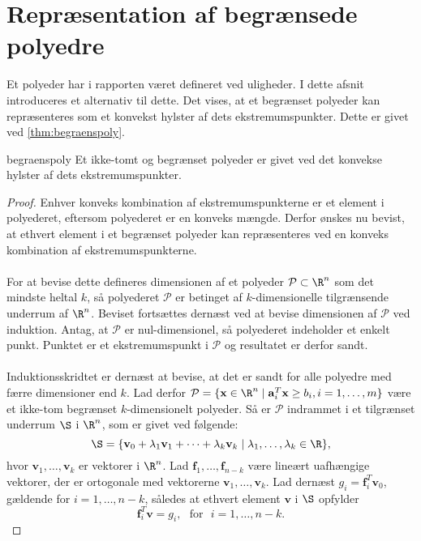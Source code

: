 \newpage
\section{Repræsentation af begrænsede polyedre}
%
Et polyeder har i rapporten været defineret ved uligheder. 
I dette afsnit introduceres et alternativ til dette. 
Det vises, at et begrænset polyeder kan repræsenteres som et konvekst hylster af dets ekstremumspunkter. 
Dette er givet ved \ref{thm:begraenspoly}. 
\begin{thm}{}{begraenspoly}
Et ikke-tomt og begrænset polyeder er givet ved det konvekse hylster af dets ekstremumspunkter.
\end{thm}
%
\begin{proof}
Enhver konveks kombination af ekstremumspunkterne er et element i polyederet, eftersom polyederet er en konveks mængde. 
Derfor ønskes nu bevist, at ethvert element i et begrænset polyeder kan repræsenteres ved en konveks kombination af ekstremumspunkterne. 
\\\\
For at bevise dette defineres dimensionen af et polyeder $\mathcal{P} \subset \R^n$ som det mindste heltal $k$, så polyederet $\mathcal{P}$ er betinget af $k$-dimensionelle tilgrænsende underrum af $\R^n$. 
Beviset fortsættes dernæst ved at bevise dimensionen af $\mathcal{P}$ ved induktion. 
Antag, at $\mathcal{P}$ er nul-dimensionel, så polyederet indeholder et enkelt punkt. 
Punktet er et ekstremumspunkt i $\mathcal{P}$ og resultatet er derfor sandt. \\\\
Induktionsskridtet er dernæst at bevise, at det er sandt for alle polyedre med færre dimensioner end $k$. Lad derfor $\mathcal{P} = \{\textbf{x} \in \R^n \mid \mathbf{a}_{i}^T \textbf{x} \geq b_i, i=1,\ldots,m\}$ være et ikke-tom begrænset $k$-dimensionelt polyeder. 
Så er $\mathcal{P}$ indrammet i et tilgrænset underrum $\S$ i $\R^n$, som er givet ved følgende: \\
$$\S = \{\textbf{v}_0+\lambda_1 \textbf{v}_1+\cdots+\lambda_k\textbf{v}_k \mid \lambda_1,\ldots,\lambda_k \in \R\},$$
hvor $\textbf{v}_1,\ldots,\textbf{v}_k$ er vektorer i $\R^n$. 
Lad $\textbf{f}_1,\ldots,\textbf{f}_{n-k}$ være lineært uafhængige vektorer, der er ortogonale med vektorerne $\textbf{v}_1,\ldots,\textbf{v}_k$. 
Lad dernæst $g_i=\mathbf{f}_{i}^T \textbf{v}_0$, gældende for $i=1,\ldots,n-k$, således at ethvert element $\textbf{v}$ i $\S$ opfylder 
$$\mathbf{f}_{i}^T \textbf{v}=g_i, \text{     } \text{for} \text{     } i=1,\ldots,n-k.$$ 

\end{proof}
